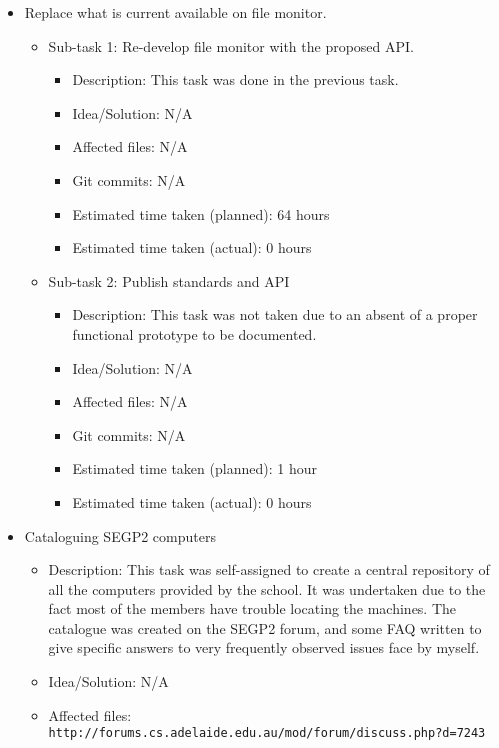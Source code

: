 \documentclass{article}
\begin{document}
\begin{itemize}
\begin{itemize}
\begin{itemize}
				\end{itemize}
	     \end{itemize}
	\item Replace what is current available on file monitor.
	     \begin{itemize}
	         \item Sub-task 1: Re-develop file monitor with the proposed API.
	            \begin{itemize}
	              \item Description: This task was done in the previous task. 
					\item Idea/Solution: N/A
					\item Affected files: N/A
					\item Git commits: N/A
					\item Estimated time taken (planned): 64 hours
					\item Estimated time taken (actual): 0 hours
				 \end{itemize}
	         \item Sub-task 2: Publish standards and API
	            \begin{itemize}
				    \item Description: This task was not taken due to an absent of a proper functional prototype to be documented. 
					\item Idea/Solution: N/A 
					\item Affected files: N/A
					\item Git commits: N/A
					\item Estimated time taken (planned): 1 hour
					\item Estimated time taken (actual): 0 hours
				 \end{itemize}
	     \end{itemize}
	\item Cataloguing SEGP2 computers
	     \begin{itemize}
	         \item Description: This task was self-assigned to create a central repository of all the computers provided by the school. It was undertaken due to the fact most of the members have trouble locating the machines. The catalogue was created on the SEGP2 forum, and some FAQ written to give specific answers to very frequently observed issues face by myself. 
	         \item Idea/Solution: N/A
	         \item Affected files: \texttt{http://forums.cs.adelaide.edu.au/mod/forum/discuss.php?d=7243}

\end{itemize}
\end{itemize}
\end{document}
